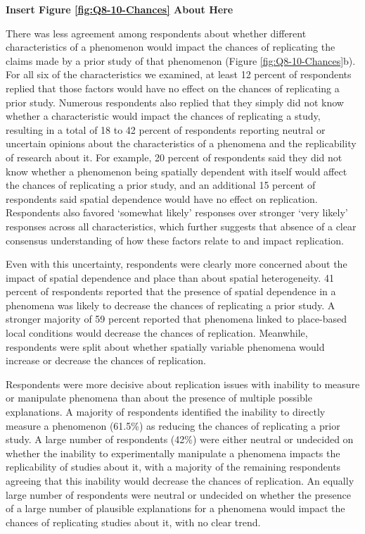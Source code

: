 \documentclass[]{interact}
\theoremstyle{plain}%
\theoremstyle{definition}
\theoremstyle{remark}
\begin{document}
\begin{center}
\textbf{Insert Figure \ref{fig:Q8-10-Chances} About Here}
\end{center}

There was less agreement among respondents about whether different characteristics of a phenomenon would impact the chances of replicating the claims made by a prior study of that phenomenon (Figure \ref{fig:Q8-10-Chances}b). 
For all six of the characteristics we examined, at least 12 percent of respondents replied that those factors would have no effect on the chances of replicating a prior study.
Numerous respondents also replied that they simply did not know whether a characteristic would impact the chances of replicating a study, resulting in a total of 18 to 42 percent of respondents reporting neutral or uncertain opinions about the characteristics of a phenomena and the replicability of research about it.
For example, 20 percent of respondents said they did not know whether a phenomenon being spatially dependent with itself would affect the chances of replicating a prior study, and an additional 15 percent of respondents said spatial dependence would have no effect on replication. 
Respondents also favored `somewhat likely' responses over stronger `very likely' responses across all characteristics, which further suggests that absence of a clear consensus understanding of how these factors relate to and impact replication.

Even with this uncertainty, respondents were clearly more concerned about the impact of spatial dependence and place than about spatial heterogeneity.
41 percent of respondents reported that the presence of spatial dependence in a phenomena was likely to decrease the chances of replicating a prior study.
A stronger majority of 59 percent reported that phenomena linked to place-based local conditions would decrease the chances of replication.
Meanwhile, respondents were split about whether spatially variable phenomena would increase or decrease the chances of replication.

Respondents were more decisive about replication issues with inability to measure or manipulate phenomena than about the presence of multiple possible explanations.
A majority of respondents identified the inability to directly measure a phenomenon (61.5\%) as reducing the chances of replicating a prior study.
A large number of respondents (42\%) were either neutral or undecided on whether the inability to experimentally manipulate a phenomena impacts the replicability of studies about it, with a majority of the remaining respondents agreeing that this inability would decrease the chances of replication. 
An equally large number of respondents were neutral or undecided on whether the presence of a large number of plausible explanations for a phenomena would impact the chances of replicating studies about it, with no clear trend.
\end{document}
